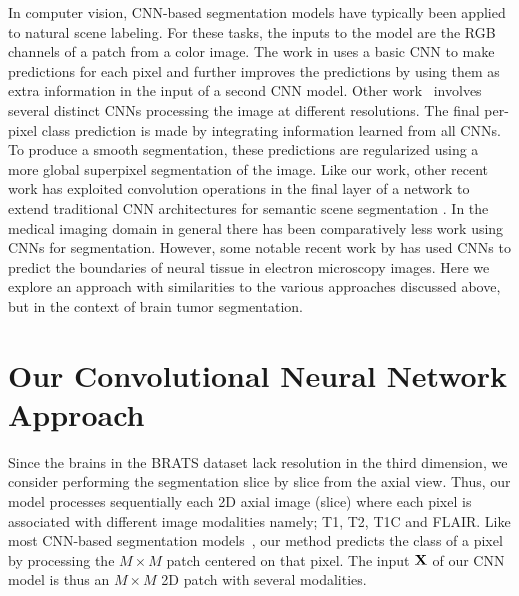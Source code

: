 \documentclass[final,5p,times,twocolumn]{elsarticle}
\begin{document}
In computer vision, CNN-based segmentation models have typically been applied to natural scene labeling.
For these tasks, the inputs to the model are the RGB channels of a patch from a color image. The work in \citet{pinheiro2014} uses a basic CNN to make predictions for each pixel and further improves the predictions by using them as extra information in the input of a second CNN model. Other work~\citep{farabet2013} involves several distinct CNNs processing the image at different resolutions. The final per-pixel class prediction is made by integrating information learned from all CNNs. To produce a smooth segmentation, these predictions are regularized using a more global superpixel segmentation of the image. Like our work, other recent work has exploited convolution operations in the final layer of a network to extend traditional CNN architectures for semantic scene segmentation \citep{long_shelhamer_fcn}. 
In the medical imaging domain in general there has been comparatively less work using CNNs for segmentation. However, some notable recent work by \citet{DeepAndWide2013} has used CNNs to predict the boundaries of neural tissue in electron microscopy images. Here we explore an approach with similarities to the various approaches discussed above, but in the context of brain tumor segmentation.











\section{Our Convolutional Neural Network Approach}
\label{sec:CNNApproach}


Since the brains in the BRATS dataset 
lack resolution in the third dimension, we consider performing the segmentation slice by slice from the axial view. 
Thus, our model processes sequentially each 2D axial image (slice) where each pixel is associated with different image modalities namely; T1, T2, T1C and FLAIR.  Like most CNN-based segmentation models~\citep{pinheiro2014,farabet2013}, our method predicts the class of a pixel by processing the $M\times M$ patch centered on that pixel.  The input ${\bf X}$ of our CNN model is thus an $M\times M$ 2D patch with several modalities.
\end{document}

